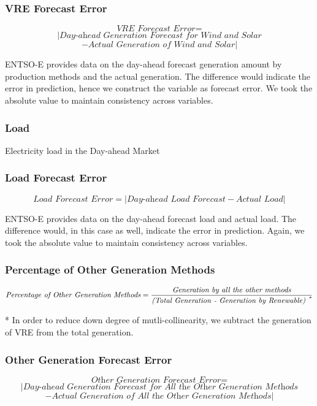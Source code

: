 \documentclass[12pt]{article}
\begin{document}
\begin{appendix}
\subsubsection*{VRE Forecast Error}
\[\textit{VRE Forecast Error} =\] \[|\textit{Day-ahead Generation Forecast for Wind and Solar}\]
\[- \textit{Actual Generation of Wind and Solar}|\]

ENTSO-E provides data on the day-ahead forecast generation amount by production methods and the actual generation. The difference would indicate the error in prediction, hence we construct the variable as forecast error. We took the absolute value to maintain consistency across variables.\par

\subsubsection*{Load}
Electricity load in the Day-ahead Market

\subsubsection*{Load Forecast Error}
\[\textit{Load Forecast Error} = |\textit{Day-ahead Load Forecast}-\textit{Actual Load}|\]

ENTSO-E provides data on the day-ahead forecast load and actual load. The difference would, in this case as well, indicate the error in prediction. Again, we took the absolute value to maintain consistency across variables.

\subsubsection*{Percentage of Other Generation Methods}
\[\textit{Percentage of Other Generation Methods} = \frac{\textit{Generation by all the other methods}} {\textit{(Total Generation - Generation by Renewable) \textsuperscript{*}}}\]

* In order to reduce down degree of mutli-collinearity, we subtract the generation of VRE from the total generation.

\subsubsection*{Other Generation Forecast Error}
\[\textit {Other Generation Forecast Error} =\] \[|\textit{Day-ahead Generation Forecast for All the Other Generation Methods}\]
\[- \textit{Actual Generation of All the Other Generation Methods}|\]


\end{appendix}
\end{document}
